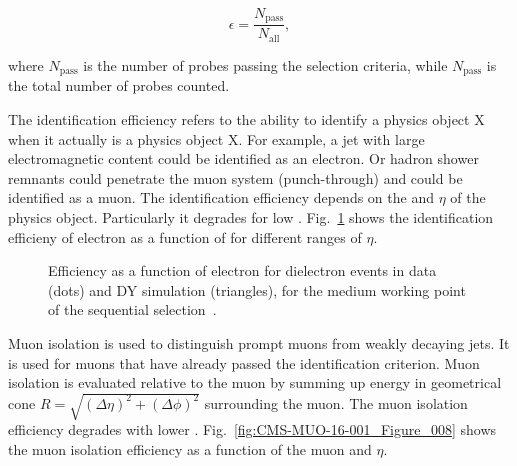 \begin{description}
\begin{equation}
\epsilon=\frac{N_{\text{pass}}}{N_{\text{all}}},
\end{equation}

where $N_{\text{pass}}$ is the number of probes passing the selection criteria, while $N_{\text{pass}}$ is the total number of probes counted.

The identification efficiency refers to the ability to identify a physics object X when it actually is a physics object X. For example, a jet with large electromagnetic content could be identified as an electron. Or hadron shower remnants could penetrate the muon system (punch-through) and could be identified as a muon. The identification efficiency depends on the \pt and $\eta$ of the physics object. Particularly it degrades for low \pt. Fig.~\ref{fig:CMS-EGM-13-001_Figure_024} shows the identification efficieny of electron as a function of \pt for different ranges of $\eta$.

\begin{figure}[htp]
\centering
  \def\twidth{0.45}
  \centering
  \hfil
\caption{Efficiency as a function of electron \pt for dielectron events in data (dots) and DY simulation (triangles), for the medium working point of the sequential selection~\cite{Khachatryan:2015hwa}.}
\label{fig:CMS-EGM-13-001_Figure_024}
\end{figure}

Muon isolation is used to distinguish prompt muons from weakly decaying jets. It is used for muons that have already passed the identification criterion. Muon isolation is evaluated relative to the muon \pt by summing up energy in geometrical cone $R=\sqrt{(\Delta\eta)^{2}+(\Delta\phi)^{2}}$ surrounding the muon. The muon isolation efficiency degrades with lower \pt. Fig.~\ref{fig:CMS-MUO-16-001_Figure_008} shows the muon isolation efficiency as a function of the muon \pt and $\eta$. 


\end{description}
